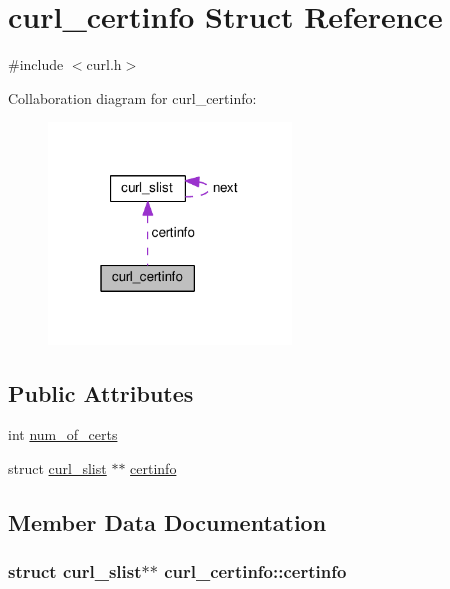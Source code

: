\hypertarget{structcurl__certinfo}{}\section{curl\+\_\+certinfo Struct Reference}
\label{structcurl__certinfo}


{\ttfamily \#include $<$curl.\+h$>$}



Collaboration diagram for curl\+\_\+certinfo\+:
\nopagebreak
\begin{figure}[H]
\begin{center}
\leavevmode
\includegraphics[width=183pt]{structcurl__certinfo__coll__graph}
\end{center}
\end{figure}
\subsection*{Public Attributes}
\begin{DoxyCompactItemize}
\item 
int \hyperlink{structcurl__certinfo_a9eb8ef837e5a8ddb848ac7bae35ed92f}{num\+\_\+of\+\_\+certs}
\item 
struct \hyperlink{structcurl__slist}{curl\+\_\+slist} $\ast$$\ast$ \hyperlink{structcurl__certinfo_abf4b9471e37ce9659080f329a64b1bab}{certinfo}
\end{DoxyCompactItemize}


\subsection{Member Data Documentation}
\subsubsection[{\texorpdfstring{certinfo}{certinfo}}]{\setlength{\rightskip}{0pt plus 5cm}struct {\bf curl\+\_\+slist}$\ast$$\ast$ curl\+\_\+certinfo\+::certinfo}\hypertarget{structcurl__certinfo_abf4b9471e37ce9659080f329a64b1bab}{}\label{structcurl__certinfo_abf4b9471e37ce9659080f329a64b1bab}
